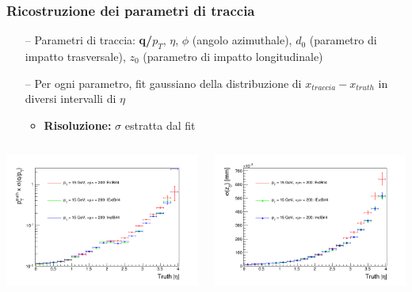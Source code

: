 \documentclass{beamer}
\begin{document}
\begin{frame}
\frametitle{Ricostruzione dei parametri di traccia}
\begin{itemize}
\item[\color{black}--] Parametri di traccia: \textbf{\color{dred}q/\boldmath$p_{T}$}, {\color{dred}\boldmath$\eta$}, {\color{dred}\boldmath$\phi$} (angolo azimuthale), {\color{dred}\boldmath$d_{0}$}
(parametro di impatto trasversale), {\color{dred}\boldmath$z_{0}$} (parametro di impatto longitudinale)
\item[\color{black}--] Per ogni parametro, fit gaussiano della distribuzione di $x_{traccia} - x_{truth}$ in diversi intervalli di $\eta$
	\begin{itemize}
	\item \textbf{Risoluzione:} $\sigma$ estratta dal fit
	\end{itemize}
\end{itemize}

\begin{columns}
\begin{column}{.5\textwidth}
\includegraphics[width=\textwidth]{Tracking/Mixed/pi15pu200_sigQPt_abseta}
\end{column}
\begin{column}{.5\textwidth}
\includegraphics[width=\textwidth]{Tracking/Mixed/pi15pu200_sigZ0_abseta}
\end{column}
\end{columns}
\end{frame}
\end{document}
